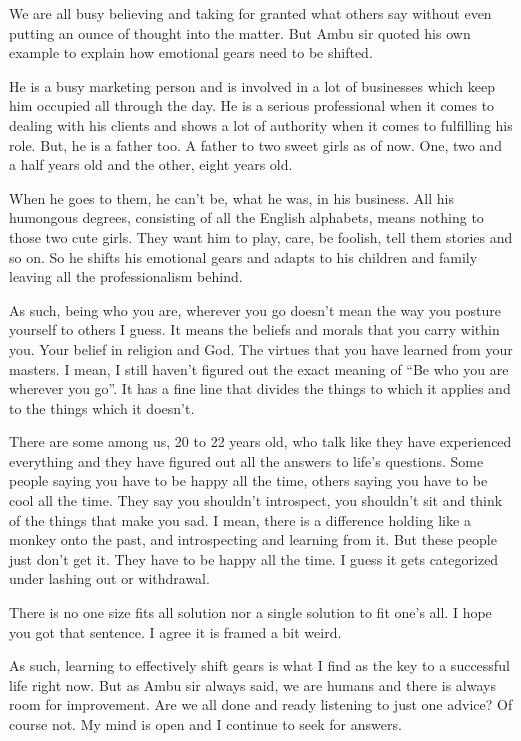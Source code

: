 \documentclass[twoside,11pt,titlepage]{article}
\begin{document}
We are all busy believing and taking for granted what others say without even putting an ounce of thought into the matter. But Ambu sir quoted his own example to explain how emotional gears need to be shifted.

He is a busy marketing person and is involved in a lot of businesses which keep him occupied all through the day. He is a serious professional when it comes to dealing with his clients and shows a lot of authority when it comes to fulfilling his role. But, he is a father too. A father to two sweet girls as of now. One, two and a half years old and the other, eight years old.

When he goes to them, he can't be, what he was, in his business. All his humongous degrees, consisting of all the English alphabets, means nothing to those two cute girls. They want him to play, care, be foolish, tell them stories and so on. So he shifts his emotional gears and adapts to his children and family leaving all the professionalism behind.

As such, being who you are, wherever you go doesn't mean the way you posture yourself to others I guess. It means the beliefs and morals that you carry within you. Your belief in religion and God. The virtues that you have learned from your masters. I mean, I still haven't figured out the exact meaning of ``Be who you are wherever you go''. It has a fine line that divides the things to which it applies and to the things which it doesn't.

There are some among us, 20 to 22 years old, who talk like they have experienced everything and they have figured out all the answers to life's questions. Some people saying you have to be happy all the time, others saying you have to be cool all the time. They say you shouldn't introspect, you shouldn't sit and think of the things that make you sad. I mean, there is a difference holding like a monkey onto the past, and introspecting and learning from it. But these people just don't get it. They have to be happy all the time. I guess it gets categorized under lashing out or withdrawal.

There is no one size fits all solution nor a single solution to fit one's all. I hope you got that sentence. I agree it is framed a bit weird.

As such, learning to effectively shift gears is what I find as the key to a successful life right now. But as Ambu sir always said, we are humans and there is always room for improvement. Are we all done and ready listening to just one advice? Of course not. My mind is open and I continue to seek for answers.
\end{document}
